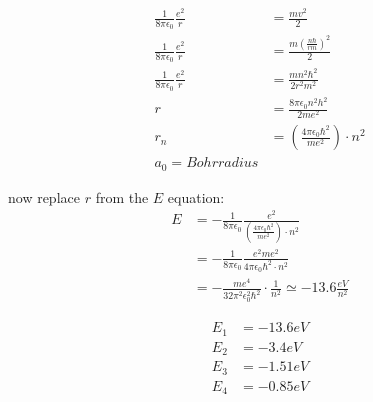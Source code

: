 \documentclass[11pt]{article}
\begin{document}
\begin{align*}
\frac{1}{8 \pi \epsilon_0} \frac{e^2}{r} &= \frac{mv^2}{2} \\
\frac{1}{8 \pi \epsilon_0} \frac{e^2}{r} &= \frac{m(\frac{n \hbar}{rm})^2}{2} \\
\frac{1}{8 \pi \epsilon_0} \frac{e^2}{r} &= \frac{m n^2 \hbar^2}{2 r^2m^2} \\
r &= \frac{8 \pi \epsilon_0 n^2 h^2 }{2 m e^2} \\
r_n &= (\frac{4 \pi \epsilon_0 \hbar^2}{me^2}) \cdot n^2 \\
a_0 = Bohr radius
\end{align*}

now replace \(r\) from the \(E\) equation:
\begin{align*}
E &= - \frac{1}{8 \pi \epsilon_0} \frac{e^2}{(\frac{4 \pi \epsilon_0 \hbar^2}{me^2}) \cdot n^2} \\
  &= - \frac{1}{8 \pi \epsilon_0} \frac{e^2me^2}{4 \pi \epsilon_0 \hbar^2 \cdot n^2} \\
  &= - \frac{me^4}{32 \pi^2 \epsilon_0^2 \hbar^2} \cdot \frac{1}{n^2} \simeq -13.6 \frac{eV}{n^2}
\end{align*}

\begin{align*}
E_1 &= -13.6 eV \\
E_2 &= -3.4 eV \\
E_3 &= -1.51 eV \\
E_4 &= -0.85 eV \\
\end{align*}
\end{document}
